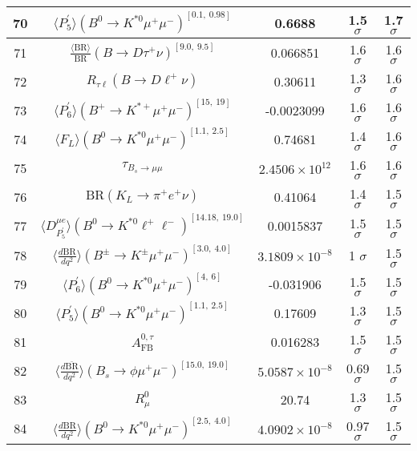 \begin{longtable}{|c|c|c|c|c|}
70 &	 $\langle P_5^\prime\rangle(B^0\to K^{\ast 0}\mu^+\mu^-)^{[0.1,\  0.98]}$ &	 0.6688 &	 \cellcolor{green!9} 1.5 $ \sigma$ &	 1.7 $ \sigma$ \\ \hline
71 &	 $\frac{\langle \mathrm{BR} \rangle}{\mathrm{BR}}(B\to D\tau^+\nu)^{[9.0,\  9.5]}$ &	 0.066851 &	 \cellcolor{green!0} 1.6 $ \sigma$ &	 1.6 $ \sigma$ \\ \hline
72 &	 $R_{\tau \ell}(B\to D\ell^+\nu)$ &	 0.30611 &	 \cellcolor{green!14} 1.3 $ \sigma$ &	 1.6 $ \sigma$ \\ \hline
73 &	 $\langle P_6^\prime\rangle(B^+\to K^{\ast +}\mu^+\mu^-)^{[15,\  19]}$ &	 -0.0023099 &	 \cellcolor{green!0} 1.6 $ \sigma$ &	 1.6 $ \sigma$ \\ \hline
74 &	 $\langle F_L\rangle(B^0\to K^{\ast 0}\mu^+\mu^-)^{[1.1,\  2.5]}$ &	 0.74681 &	 \cellcolor{green!9} 1.4 $ \sigma$ &	 1.6 $ \sigma$ \\ \hline
75 &	 $\tau_{B_s \to \mu\mu}$ &	 $2.4506\times 10^{12}$ &	 \cellcolor{red!0} 1.6 $ \sigma$ &	 1.6 $ \sigma$ \\ \hline
76 &	 $\mathrm{BR}(K_L\to \pi^+e^+\nu)$ &	 0.41064 &	 \cellcolor{green!6} 1.4 $ \sigma$ &	 1.5 $ \sigma$ \\ \hline
77 &	 $\langle D_{P_5^\prime}^{\mu e} \rangle(B^0\to K^{\ast 0}\ell^+\ell^-)^{[14.18,\  19.0]}$ &	 0.0015837 &	 \cellcolor{green!0} 1.5 $ \sigma$ &	 1.5 $ \sigma$ \\ \hline
78 &	 $\langle \frac{d\mathrm{BR}}{dq^2} \rangle(B^\pm\to K^\pm \mu^+\mu^-)^{[3.0,\  4.0]}$ &	 $3.1809\times 10^{-8}$ &	 \cellcolor{green!25} 1 $ \sigma$ &	 1.5 $ \sigma$ \\ \hline
79 &	 $\langle P_6^\prime\rangle(B^0\to K^{\ast 0}\mu^+\mu^-)^{[4,\  6]}$ &	 -0.031906 &	 \cellcolor{green!0} 1.5 $ \sigma$ &	 1.5 $ \sigma$ \\ \hline
80 &	 $\langle P_5^\prime\rangle(B^0\to K^{\ast 0}\mu^+\mu^-)^{[1.1,\  2.5]}$ &	 0.17609 &	 \cellcolor{green!12} 1.3 $ \sigma$ &	 1.5 $ \sigma$ \\ \hline
81 &	 $A_\mathrm{FB}^{0,\tau}$ &	 0.016283 &	 \cellcolor{green!2} 1.5 $ \sigma$ &	 1.5 $ \sigma$ \\ \hline
82 &	 $\langle \frac{d\overline{\mathrm{BR}}}{dq^2} \rangle(B_s\to \phi \mu^+\mu^-)^{[15.0,\  19.0]}$ &	 $5.0587\times 10^{-8}$ &	 \cellcolor{green!40} 0.69 $ \sigma$ &	 1.5 $ \sigma$ \\ \hline
83 &	 $R_\mu^0$ &	 20.74 &	 \cellcolor{green!8} 1.3 $ \sigma$ &	 1.5 $ \sigma$ \\ \hline
84 &	 $\langle \frac{d\mathrm{BR}}{dq^2} \rangle(B^0\to K^{\ast 0}\mu^+\mu^-)^{[2.5,\  4.0]}$ &	 $4.0902\times 10^{-8}$ &	 \cellcolor{green!25} 0.97 $ \sigma$ &	 1.5 $ \sigma$ \\ \hline

\end{longtable}
